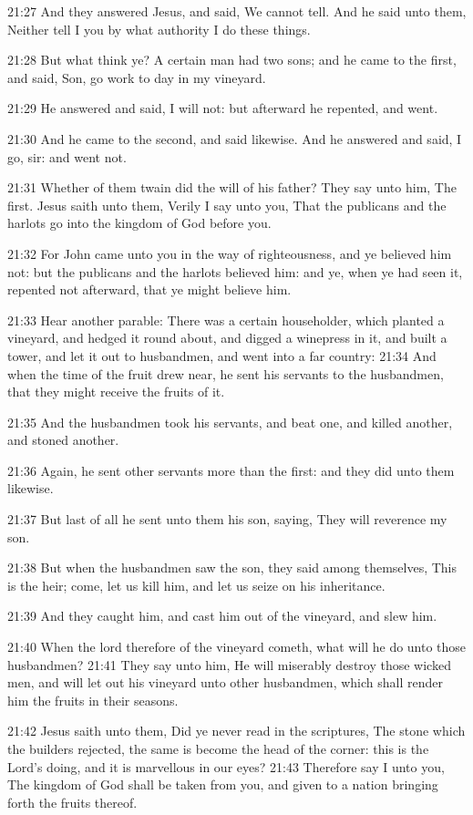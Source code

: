 21:27 And they answered Jesus, and said, We cannot tell. And he said
unto them, Neither tell I you by what authority I do these things.

21:28 But what think ye? A certain man had two sons; and he came to
the first, and said, Son, go work to day in my vineyard.

21:29 He answered and said, I will not: but afterward he repented, and
went.

21:30 And he came to the second, and said likewise. And he answered
and said, I go, sir: and went not.

21:31 Whether of them twain did the will of his father? They say unto
him, The first. Jesus saith unto them, Verily I say unto you, That the
publicans and the harlots go into the kingdom of God before you.

21:32 For John came unto you in the way of righteousness, and ye
believed him not: but the publicans and the harlots believed him: and
ye, when ye had seen it, repented not afterward, that ye might believe
him.

21:33 Hear another parable: There was a certain householder, which
planted a vineyard, and hedged it round about, and digged a winepress
in it, and built a tower, and let it out to husbandmen, and went into
a far country: 21:34 And when the time of the fruit drew near, he sent
his servants to the husbandmen, that they might receive the fruits of
it.

21:35 And the husbandmen took his servants, and beat one, and killed
another, and stoned another.

21:36 Again, he sent other servants more than the first: and they did
unto them likewise.

21:37 But last of all he sent unto them his son, saying, They will
reverence my son.

21:38 But when the husbandmen saw the son, they said among themselves,
This is the heir; come, let us kill him, and let us seize on his
inheritance.

21:39 And they caught him, and cast him out of the vineyard, and slew
him.

21:40 When the lord therefore of the vineyard cometh, what will he do
unto those husbandmen?  21:41 They say unto him, He will miserably
destroy those wicked men, and will let out his vineyard unto other
husbandmen, which shall render him the fruits in their seasons.

21:42 Jesus saith unto them, Did ye never read in the scriptures, The
stone which the builders rejected, the same is become the head of the
corner: this is the Lord's doing, and it is marvellous in our eyes?
21:43 Therefore say I unto you, The kingdom of God shall be taken from
you, and given to a nation bringing forth the fruits thereof.

